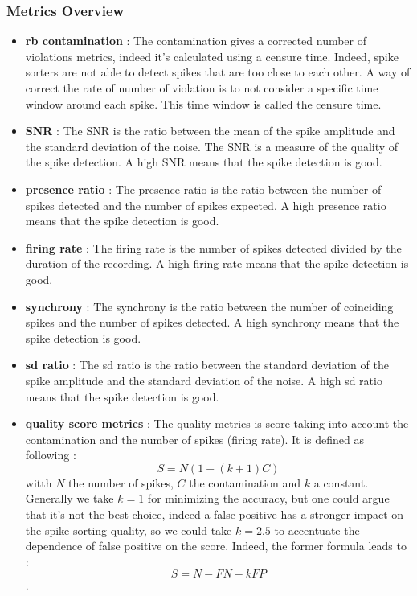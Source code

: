 \documentclass[11pt,a4paper]{report}
\begin{document}
\begin{multicols}{2}
    \subsubsection{Metrics Overview}
    \begin{itemize}
        \item \textbf{rb contamination} : The contamination gives a corrected number of violations metrics, indeed it's calculated using a censure time. Indeed, spike sorters are not able to detect spikes that are too close to each other. A way of correct the rate of number of violation is to not consider a specific time window around each spike. This time window is called the censure time.
        \item \textbf{SNR} : The SNR is the ratio between the mean of the spike amplitude and the standard deviation of the noise. The SNR is a measure of the quality of the spike detection. A high SNR means that the spike detection is good.
        \item \textbf{presence ratio} : The presence ratio is the ratio between the number of spikes detected and the number of spikes expected. A high presence ratio means that the spike detection is good.
        \item \textbf{firing rate} : The firing rate is the number of spikes detected divided by the duration of the recording. A high firing rate means that the spike detection is good.
        \item \textbf{synchrony} : The synchrony is the ratio between the number of coinciding spikes and the number of spikes detected. A high synchrony means that the spike detection is good.
        \item \textbf{sd ratio} : The sd ratio is the ratio between the standard deviation of the spike amplitude and the standard deviation of the noise. A high sd ratio means that the spike detection is good.
        \item  \textbf{quality score metrics} :  The quality metrics is score taking into account the contamination and the number of spikes (firing rate). It is defined as following :
              $$S = N(1 - (k+1)C)$$ witth $N$ the number of spikes, $C$ the contamination and $k$ a constant. Generally we take $k = 1$ for minimizing the accuracy, but one could argue that it's not the best choice, indeed a false positive has a stronger impact on the spike sorting quality,
              so we could take $k = 2.5$ to accentuate the dependence of false positive on the score. Indeed, the former formula leads to : $$S = N - FN - k FP$$.

\end{itemize}
\end{multicols}
\end{document}
